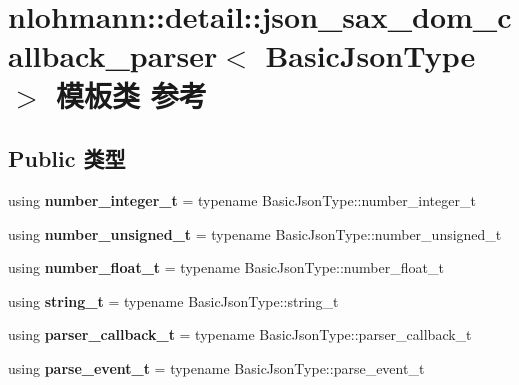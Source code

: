 \hypertarget{classnlohmann_1_1detail_1_1json__sax__dom__callback__parser}{}\section{nlohmann\+::detail\+::json\+\_\+sax\+\_\+dom\+\_\+callback\+\_\+parser$<$ Basic\+Json\+Type $>$ 模板类 参考}
\label{classnlohmann_1_1detail_1_1json__sax__dom__callback__parser}
\subsection*{Public 类型}
\begin{DoxyCompactItemize}
\item 
\mbox{\label{classnlohmann_1_1detail_1_1json__sax__dom__callback__parser_a3ba8fc7a8d83c5b0eeb3b543ad844b8d}} 
using {\bfseries number\+\_\+integer\+\_\+t} = typename Basic\+Json\+Type\+::number\+\_\+integer\+\_\+t
\item 
\mbox{\label{classnlohmann_1_1detail_1_1json__sax__dom__callback__parser_a2406c5125f7128fb9c01921df2903001}} 
using {\bfseries number\+\_\+unsigned\+\_\+t} = typename Basic\+Json\+Type\+::number\+\_\+unsigned\+\_\+t
\item 
\mbox{\label{classnlohmann_1_1detail_1_1json__sax__dom__callback__parser_a914ea0555cea5290449fb791ae41c655}} 
using {\bfseries number\+\_\+float\+\_\+t} = typename Basic\+Json\+Type\+::number\+\_\+float\+\_\+t
\item 
\mbox{\label{classnlohmann_1_1detail_1_1json__sax__dom__callback__parser_a00e7d95d82d5d8a43421526a42a8eabc}} 
using {\bfseries string\+\_\+t} = typename Basic\+Json\+Type\+::string\+\_\+t
\item 
\mbox{\label{classnlohmann_1_1detail_1_1json__sax__dom__callback__parser_a4f636086fa8e7cf26c35c8afd50903ce}} 
using {\bfseries parser\+\_\+callback\+\_\+t} = typename Basic\+Json\+Type\+::parser\+\_\+callback\+\_\+t
\item 
\mbox{\label{classnlohmann_1_1detail_1_1json__sax__dom__callback__parser_aac6d706967b2ecc2510e172577d8550b}} 
using {\bfseries parse\+\_\+event\+\_\+t} = typename Basic\+Json\+Type\+::parse\+\_\+event\+\_\+t
\end{DoxyCompactItemize}
